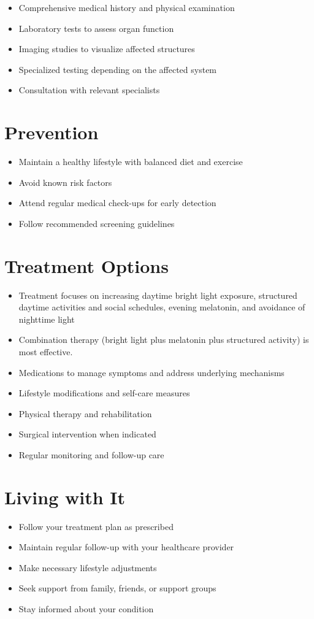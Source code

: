 \begin{itemize}[noitemsep]
  \item Comprehensive medical history and physical examination
  \item Laboratory tests to assess organ function
  \item Imaging studies to visualize affected structures
  \item Specialized testing depending on the affected system
  \item Consultation with relevant specialists
\end{itemize}
\section{Prevention}
\begin{itemize}[noitemsep]
  \item Maintain a healthy lifestyle with balanced diet and exercise
  \item Avoid known risk factors
  \item Attend regular medical check-ups for early detection
  \item Follow recommended screening guidelines
\end{itemize}
\section{Treatment Options}
\begin{itemize}[noitemsep]
  \item Treatment focuses on increasing daytime bright light exposure, structured daytime activities and social schedules, evening melatonin, and avoidance of nighttime light
  \item Combination therapy (bright light plus melatonin plus structured activity) is most effective.
  \item Medications to manage symptoms and address underlying mechanisms
  \item Lifestyle modifications and self-care measures
  \item Physical therapy and rehabilitation
  \item Surgical intervention when indicated
  \item Regular monitoring and follow-up care
\end{itemize}
\section{Living with It}
\begin{itemize}[noitemsep]
  \item Follow your treatment plan as prescribed
  \item Maintain regular follow-up with your healthcare provider
  \item Make necessary lifestyle adjustments
  \item Seek support from family, friends, or support groups
  \item Stay informed about your condition
\end{itemize}
